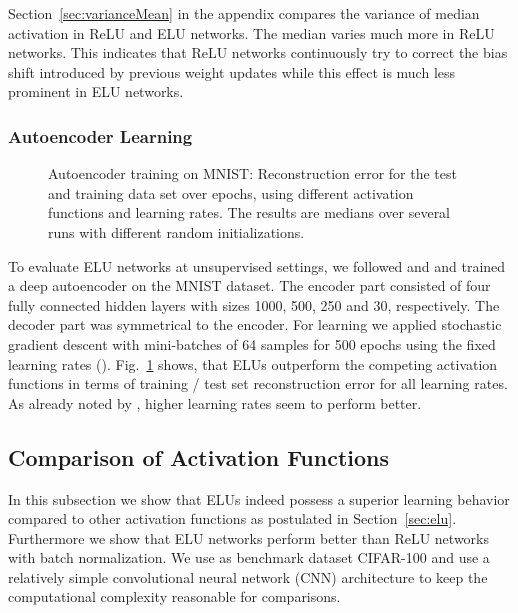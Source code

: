 \documentclass{article}
\begin{document}
Section~\ref{sec:varianceMean} in the appendix compares the variance
of median activation in ReLU and ELU networks.
The median varies much more in ReLU networks.
This indicates that ReLU networks continuously try to correct
the bias shift introduced by previous weight updates
while this effect is much less prominent in ELU networks.

\subsubsection{Autoencoder Learning}

\begin{figure}[!ht]
\begin{center}
\end{center}
\caption{Autoencoder training on MNIST: Reconstruction error for the test and training  data set over
epochs, using different activation functions and learning rates. The results are medians
over several runs with different random initializations.
\label{fig:mnistAuto}}
\end{figure}




To evaluate ELU networks at unsupervised settings, we followed
\citet{Martens:10} and \citet{Desjardins:15} and trained a
deep autoencoder on the MNIST dataset.
The encoder part consisted of four
fully connected hidden layers with sizes 1000, 500, 250 and 30, respectively.
The decoder part was symmetrical to the encoder.
For learning we applied stochastic gradient descent with mini-batches of 64 samples for 500 epochs
using the fixed learning rates ().
Fig.~\ref{fig:mnistAuto} shows, that ELUs outperform the competing
activation functions in terms of training / test set reconstruction error for all learning rates.
As already noted by \citet{Desjardins:15}, higher learning rates
seem to perform better.



\subsection{Comparison of Activation Functions}
\label{sec:compFunctions}

In this subsection we show that ELUs indeed possess a superior
learning behavior compared to other activation functions as
postulated in Section~\ref{sec:elu}.
Furthermore we show that ELU networks perform better than ReLU
networks with batch normalization.
We use as benchmark dataset CIFAR-100 and use a relatively
simple convolutional neural network (CNN) architecture to keep the
computational complexity reasonable for comparisons.
\end{document}
